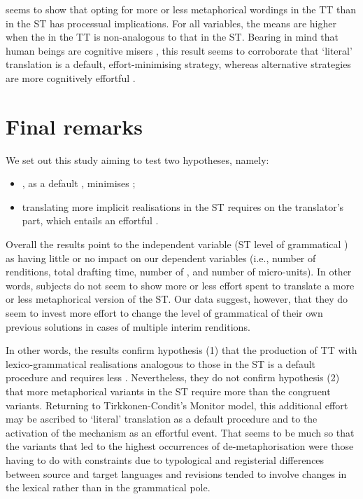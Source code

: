 \documentclass[output=paper]{LSP/langsci}
\begin{document}
\largerpage
{} seems to show that opting for more or less metaphorical wordings in the TT than in the ST has processual implications. For all variables, the means are higher when the  in the TT is non-analogous to that in the ST. Bearing in mind that human beings are cognitive misers \citep{Fiske1984}, this result seems to corroborate that `literal' translation is a default, effort-minimising strategy, whereas alternative strategies are more cognitively effortful \citep{TirkkonenCondit2005}.

\section{Final remarks}

We set out this study aiming to test two hypotheses, namely:

\begin{itemize}
\item {}, as a default , minimises ; 
\item translating more implicit realisations in the ST requires  on the translator's part, which entails an effortful .
\end{itemize}

Overall the results point to the independent variable (ST level of grammatical ) as having little or no impact on our dependent variables (i.e., number of renditions, total drafting time, number of , and number of micro-units). In other words, subjects do not seem to show more or less effort spent to translate a more or less metaphorical version of the ST. Our data suggest, however, that they do seem to invest more effort to change the level of grammatical  of their own previous solutions in cases of multiple interim renditions. 

In other words, the results confirm hypothesis (1) that the production of TT with lexico-grammatical realisations analogous to those in the ST is a default procedure and requires less . Nevertheless, they do not confirm hypothesis (2) that more metaphorical variants in the ST require more  than the congruent variants. Returning to Tirkkonen-Condit's \citeyearpar{TirkkonenCondit2005} Monitor model, this additional effort may be ascribed to `literal' translation as a default procedure and to the activation of the  mechanism as an effortful event. That seems to be much so that the variants that led to the highest occurrences of de-meta\-phor\-i\-sa\-tion were those having to do with constraints due to typological and registerial differences between source and target languages and revisions tended to involve changes in the lexical rather than in the grammatical pole.
\end{document}
